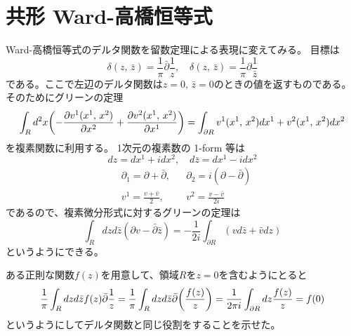 \documentclass[../../master.tex]{subfiles}
\begin{document}
\section{共形 Ward-高橋恒等式}
Ward-高橋恒等式のデルタ関数を留数定理による表現に変えてみる。
目標は
\begin{equation}
    \delta(z,\,\bar{z}) = \frac{1}{\pi}\bar{\partial}\frac{1}{z},\quad
    \delta(z,\,\bar{z}) = \frac{1}{\pi}\partial\frac{1}{\bar{z}}
\end{equation}
である。ここで左辺のデルタ関数は\(z=0,\,\bar{z}=0\)のときの値を返すものである。
そのためにグリーンの定理
\begin{equation}
    \int_R d^2x \qty(-\pdv{v^1(x^1,\,x^2)}{x^2}+\pdv{v^2(x^1,\,x^2)}{x^1})
    = \int_{\partial R} v^1(x^1,\,x^2)dx^1+v^2(x^1,\,x^2)dx^2
\end{equation}
を複素関数に利用する。
1次元の複素数の 1-form 等は
\begin{equation}
    dz = dx^1+idx^2,\quad d\bar{z} = dx^1-idx^2
\end{equation}
\begin{align*}
    &\partial_1 = \partial +\bar{\partial},& &\partial_2 = i(\partial-\bar{\partial})\\
    &v^1 = \frac{v+\bar{v}}{2}, & & v^2 = \frac{v-\bar{v}}{2i}
\end{align*}
であるので、複素微分形式に対するグリーンの定理は
\begin{equation}
    \int_R dz d\bar{z} (\partial v - \bar{\partial}\bar{z}) = -\frac{1}{2i}\int_{\partial R}(vd\bar{z}+\bar{v}dz)
\end{equation}
というようにできる。

ある正則な関数\(f(z)\)を用意して、領域\(R\)を\(z=0\)を含むようにとると
\setcounter{equation}{45}
\begin{equation}
    \frac{1}{\pi}\int_R dz d\bar{z} f(z)\bar{\partial}\frac{1}{z}
    = \frac{1}{\pi}\int_R dz d\bar{z} \bar{\partial}\qty(\frac{f(z)}{z} )
    = \frac{1}{2\pi i}\int_{\partial R} dz\frac{f(z)}{z} = f(0)
\end{equation}
というようにしてデルタ関数と同じ役割をすることを示せた。
\end{document}
